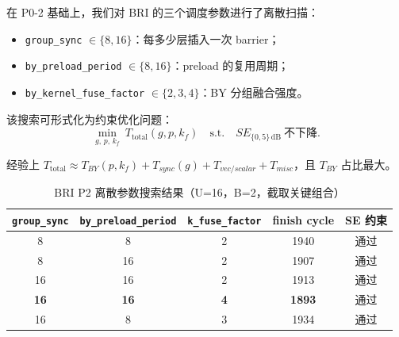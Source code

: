 \documentclass{CjC}
\begin{document}
    在 P0-2 基础上，我们对 BRI 的三个调度参数进行了离散扫描：

    \begin{itemize}
        \item \texttt{group\_sync} $\in\{8,16\}$：每多少层插入一次 barrier；

        \item \texttt{by\_preload\_period} $\in\{8,16\}$：preload 的复用周期；

        \item \texttt{by\_kernel\_fuse\_factor} $\in\{2,3,4\}$：BY 分组融合强度。
    \end{itemize}

    该搜索可形式化为约束优化问题：
    \begin{equation}
        \min_{g,\,p,\,k_f}\ T_{\text{total}}(g,p,k_{f})\quad\text{s.t.}\quad SE_{\{0,5\}\,\mathrm{dB}}
        \ \text{不下降}.
    \end{equation}

    经验上
    $T_{\text{total}}\approx T_{BY}(p,k_{f}) + T_{sync}(g) + T_{vec/scalar}+ T_{misc}$，且
    $T_{BY}$ 占比最大。

    \begin{table}[H]
        \centering
        \caption{BRI P2 离散参数搜索结果（U=16，B=2，截取关键组合）}
        \begin{tabular}{c c c c c}
            \toprule \texttt{group\_sync} & \texttt{by\_preload\_period} & \texttt{k\_fuse\_factor} & \textbf{finish cycle} & SE 约束 \\
            \midrule 8                    & 8                            & 2                        & 1940                  & 通过    \\
            8                             & 16                           & 2                        & 1907                  & 通过    \\
            16                            & 16                           & 2                        & 1913                  & 通过    \\
            \textbf{16}                   & \textbf{16}                  & \textbf{4}               & \textbf{1893}         & 通过    \\
            16                            & 8                            & 3                        & 1934                  & 通过    \\
            \bottomrule
        \end{tabular}
    \end{table}
\end{document}
